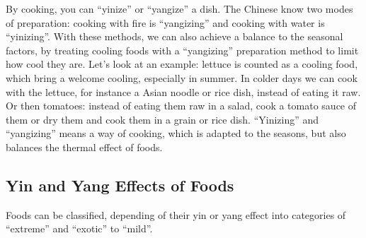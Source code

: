 \documentclass[../main.tex]{subfiles}
\begin{document}
\noindent By cooking, you can ``yinize'' or ``yangize'' a dish.
The Chinese know two modes of preparation: cooking with fire is ``yangizing'' and cooking with water is ``yinizing''.
With these methods, we can also achieve a balance to the seasonal factors, by treating cooling foods with a ``yangizing'' preparation method
to limit how cool they are.
Let's look at an example: lettuce is counted as a cooling food, which bring a welcome cooling, especially in summer.
In colder days we can cook with the lettuce, for instance a Asian noodle or rice dish, instead of eating it raw.
Or then tomatoes: instead of eating them raw in a salad, cook a tomato sauce of them or dry them and cook them in a grain or rice dish.
``Yinizing'' and ``yangizing'' means a way of cooking, which is adapted to the seasons, but also balances the thermal effect of foods.

\subsection{Yin and Yang Effects of Foods}
Foods can be classified, depending of their yin or yang effect into categories of ``extreme'' and ``exotic'' to ``mild''.
\end{document}
